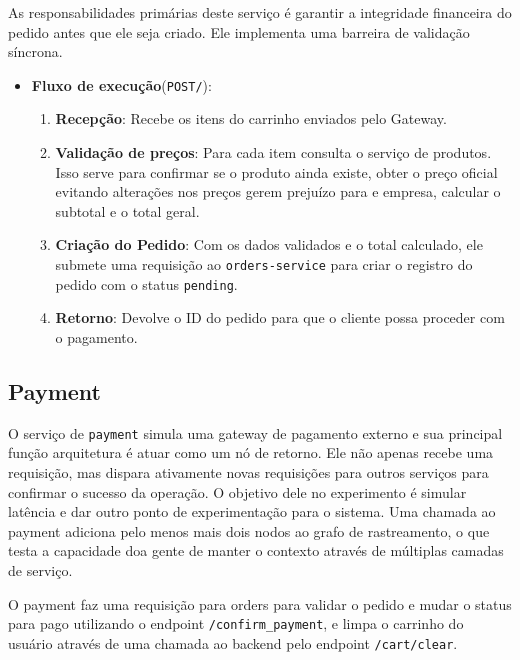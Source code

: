 As responsabilidades primárias deste serviço é garantir a integridade financeira do pedido antes que ele seja criado. Ele implementa uma barreira de validação síncrona.
\begin{itemize}
    \item \textbf{Fluxo de execução}(\texttt{POST/}):
    \begin{enumerate}
        \item \textbf{Recepção}: Recebe os itens do carrinho enviados pelo Gateway.
        \item \textbf{Validação de preços}: Para cada item consulta o serviço de produtos. Isso serve para confirmar se o produto ainda existe, obter o preço oficial evitando alterações nos preços gerem prejuízo para e empresa, calcular o subtotal e o total geral.
        \item \textbf{Criação do Pedido}: Com os dados validados e o total calculado, ele submete uma requisição ao \texttt{orders-service} para criar o registro do pedido com o status \texttt{pending}.
        \item \textbf{Retorno}: Devolve o ID do pedido para que o cliente possa proceder com o pagamento.
    \end{enumerate}
\end{itemize}
\subsection{Payment}
O serviço de \texttt{payment} simula uma gateway de pagamento externo e sua principal função arquitetura é atuar como um nó de retorno. Ele não apenas recebe uma requisição, mas dispara ativamente novas requisições para outros serviços para confirmar o sucesso da operação. O objetivo dele no experimento é simular latência e dar outro ponto de experimentação para o sistema. Uma chamada ao payment adiciona pelo menos mais dois nodos ao grafo de rastreamento, o que testa a capacidade doa gente de manter o contexto através de múltiplas camadas de serviço.

O payment faz uma requisição para orders para validar o pedido e mudar o status para pago utilizando o endpoint \texttt{/confirm\_payment}, e limpa o carrinho do usuário através de uma chamada ao backend pelo endpoint \texttt{/cart/clear}.

